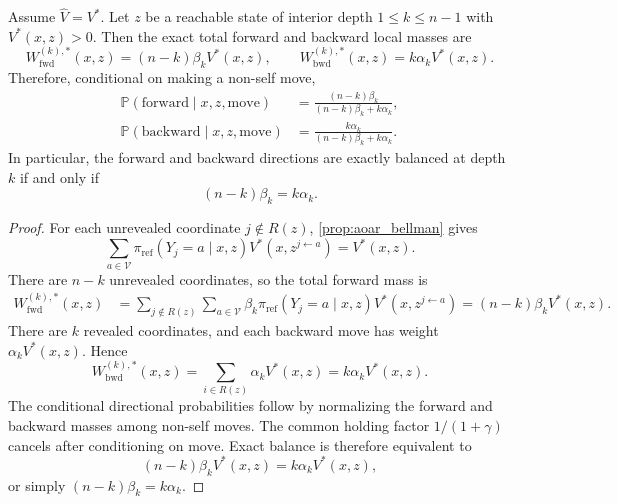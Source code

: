 \documentclass{article}
\numberwithin{theorem}{section}
\numberwithin{proposition}{section}
\numberwithin{corollary}{section}
\numberwithin{lemma}{section}
\numberwithin{conjecture}{section}
\numberwithin{remark}{section}
\numberwithin{definition}{section}
\numberwithin{assumption}{section}
\numberwithin{example}{section}
\newcommand{\calV}{{\mathcal{V}}}
\newcommand{\bbP}{\mathbb{P}}
\providecommand{\base}{\pi_{\mathrm{ref}}}
\begin{document}
\begin{proposition}
\label{prop:balanced_directional_masses}
Assume $\widehat V=V^*$. Let $z$ be a reachable state of interior depth $1\le k\le n-1$ with $V^*(x,z)>0$. Then the exact total forward and backward local masses are
\begin{equation*}
    W_{\mathrm{fwd}}^{(k),*}(x,z) = (n-k)\beta_k V^*(x,z), \qquad
    W_{\mathrm{bwd}}^{(k),*}(x,z) = k\alpha_k V^*(x,z).
\end{equation*}
Therefore, conditional on making a non-self move,
\begin{align*}
    \bbP(\mathrm{forward}\mid x,z,\mathrm{move}) &= \frac{(n-k)\beta_k}{(n-k)\beta_k+k\alpha_k},\\
    \bbP(\mathrm{backward}\mid x,z,\mathrm{move}) &= \frac{k\alpha_k}{(n-k)\beta_k+k\alpha_k}.
\end{align*}
In particular, the forward and backward directions are exactly balanced at depth $k$ if and only if
\begin{equation*}
    (n-k)\beta_k = k\alpha_k.
\end{equation*}
\end{proposition}

\begin{proof}
For each unrevealed coordinate $j\notin R(z)$, \cref{prop:aoar_bellman} gives
\begin{equation*}
    \sum_{a\in\calV} \base(Y_j=a\mid x,z) V^*(x,z^{j\leftarrow a}) = V^*(x,z).
\end{equation*}
There are $n-k$ unrevealed coordinates, so the total forward mass is
\begin{align*}
    W_{\mathrm{fwd}}^{(k),*}(x,z)
    &=
    \sum_{j\notin R(z)}\sum_{a\in\calV}
    \beta_k\base(Y_j=a\mid x,z)V^*(x,z^{j\leftarrow a})
    =
    (n-k)\beta_k V^*(x,z).
\end{align*}
There are $k$ revealed coordinates, and each backward move has weight $\alpha_k V^*(x,z)$. Hence
\begin{equation*}
    W_{\mathrm{bwd}}^{(k),*}(x,z) = \sum_{i\in R(z)}\alpha_k V^*(x,z) = k\alpha_k V^*(x,z).
\end{equation*}
The conditional directional probabilities follow by normalizing the forward and backward masses among non-self moves. The common holding factor $1/(1+\gamma)$ cancels after conditioning on $\mathrm{move}$. Exact balance is therefore equivalent to
\begin{equation*}
    (n-k)\beta_k V^*(x,z)=k\alpha_k V^*(x,z),
\end{equation*}
or simply $(n-k)\beta_k=k\alpha_k$.
\end{proof}
\end{document}
